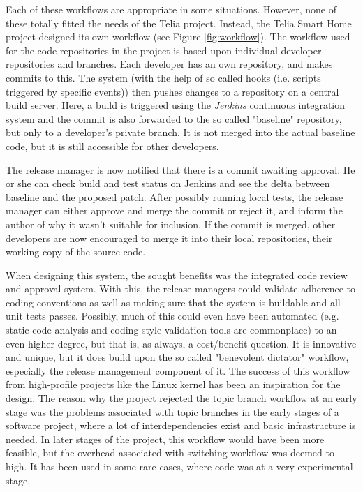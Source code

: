 \documentclass{article}
\begin{document}
Each of these workflows are appropriate in some situations. However,
none of these totally fitted the needs of the Telia project. Instead,
the Telia Smart Home project designed its own workflow (see Figure
\ref{fig:workflow}). The workflow used for the code repositories in the
project is based upon individual developer repositories and branches.
Each developer has an own repository, and makes commits to this. The
system (with the help of so called hooks (i.e. scripts triggered by
specific events)) then pushes changes to a repository on a central build
server. Here, a build is triggered using the \emph{Jenkins} continuous
integration system and the commit is also forwarded to the so called
"baseline" repository, but only to a developer's private branch. It is
not merged into the actual baseline code, but it is still accessible for
other developers.

The release manager is now notified that there is a commit awaiting
approval. He or she can check build and test status on Jenkins and see the
delta between baseline and the proposed patch. After possibly running local
tests, the release manager can either approve and merge the commit or
reject it, and inform the author of why it wasn't suitable for inclusion.
If the commit is merged, other developers are now encouraged to merge it 
into their local repositories, their working copy of the source code. 

When designing this system, the sought benefits was the integrated code 
review and approval system. With this, the release managers could validate 
adherence to coding conventions as well as making sure that the system
is buildable and all unit tests passes. Possibly, much of this could even
have been automated (e.g. static code analysis and coding style validation
tools are commonplace) to an even higher degree, but that is, as always, a 
cost/benefit question. It is innovative and unique, but it does build upon
the so called "benevolent dictator" workflow, especially the release
management component of it. The success of this workflow from high-profile 
projects like the Linux kernel has been an inspiration for the design.
The reason why the project rejected the topic branch workflow at an early
stage was the problems associated with topic branches in the early stages
of a software project, where a lot of interdependencies exist and basic
infrastructure is needed. In later stages of the project, this workflow
would have been more feasible, but the overhead associated with switching
workflow was deemed to high. It has been used in some rare cases, where code
was at a very experimental stage.
\end{document}
